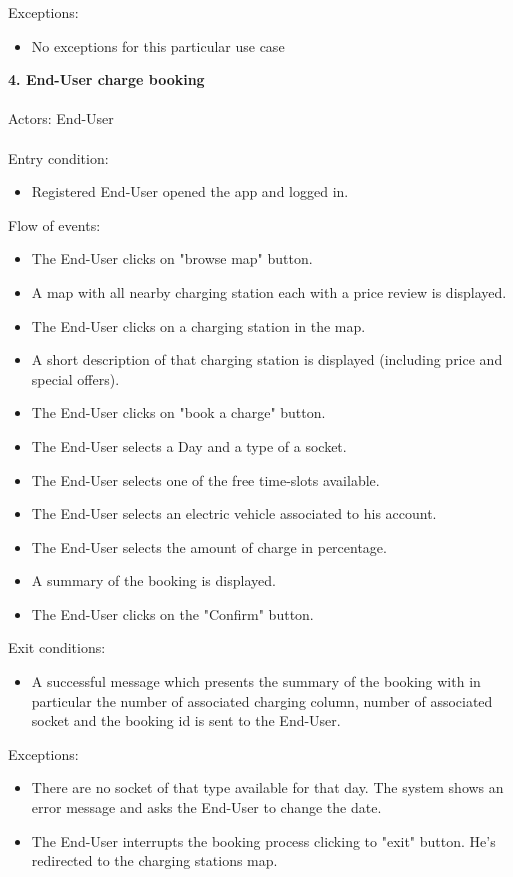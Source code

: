 \documentclass[a4paper]{report}
\begin{document}
Exceptions: 
\begin{itemize}
\item No exceptions for this particular use case
\end{itemize}
\textbf{4. End-User charge booking}\label{uc:4}
\\
\\
Actors: End-User \\ \\
Entry condition:
\begin{itemize}
\item Registered End-User opened the app and logged in.
\end{itemize}
Flow of events:
\begin{itemize}
\item The End-User clicks on "browse map" button.
\item A map with all nearby charging station each with a price review is displayed.
\item The End-User clicks on a charging station in the map.
\item A short description of that charging station is displayed (including price and special offers).
\item The End-User clicks on "book a charge" button.
\item The End-User selects a Day and a type of a socket.
\item The End-User selects one of the free time-slots available.
\item The End-User selects an electric vehicle associated to his account.
\item The End-User selects the amount of charge in percentage.
\item A summary of the booking is displayed.
\item The End-User clicks on the "Confirm" button.
\end{itemize}
Exit conditions:
\begin{itemize}
\item A successful message which presents the summary of the booking with in particular the number of associated charging column, number of associated socket and the booking id is sent to the End-User.
 \end{itemize}
Exceptions: 
 \begin{itemize}
 \item There are no socket of that type available for that day. The system shows an error message and asks the End-User to change the date.
 \item The End-User interrupts the booking process clicking to "exit" button. He's redirected to the charging stations map.
\end{itemize}
\end{document}
